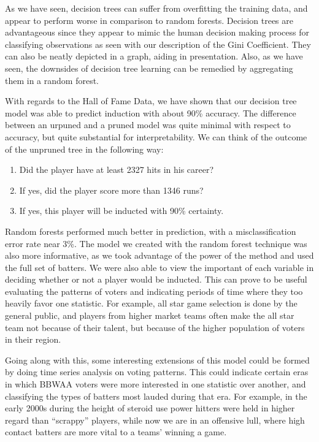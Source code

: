 \documentclass[preprint,12pt]{elsarticle}
\begin{document}
As we have seen, decision trees can suffer from overfitting the training data, and appear to perform worse in comparison to random forests. Decision trees are advantageous since they appear to mimic the human decision making process for classifying observations as seen with our description of the Gini Coefficient. They can also be neatly depicted in a graph, aiding in presentation. Also, as we have seen, the downsides of decision tree learning can be remedied by aggregating them in a random forest.

With regards to the Hall of Fame Data, we have shown that our decision tree model was able to predict induction with about 90\% accuracy. The difference between an urpuned and a pruned model was quite minimal with respect to accuracy, but quite substantial for interpretability. We can think of the outcome of the unpruned tree in the following way:


\begin{enumerate}
	\item Did the player have at least 2327 hits in his career?
	\item If yes, did the player score more than 1346 runs?
	\item If yes, this player will be inducted with 90\% certainty. 
\end{enumerate}

Random forests performed much better in prediction, with a misclassification error rate near 3\%. The model we created with the random forest technique was also more informative, as we took advantage of the power of the method and used the full set of batters. We were also able to view the important of each variable in deciding whether or not a player would be inducted. This can prove to be useful evaluating the patterns of voters and indicating periods of time where they too heavily favor one statistic. For example, all star game selection is done by the general public, and players from higher market teams often make the all star team not because of their talent, but because of the higher population of voters in their region.

Going along with this, some interesting extensions of this model could be formed by doing time series analysis on voting patterns. This could indicate certain eras in which BBWAA voters were more interested in one statistic over another, and classifying the types of batters most lauded during that era. For example, in the early 2000s during the height of steroid use power hitters were held in higher regard than ``scrappy'' players, while now we are in an offensive lull, where high contact batters are more vital to a teams' winning a game.
\end{document}
